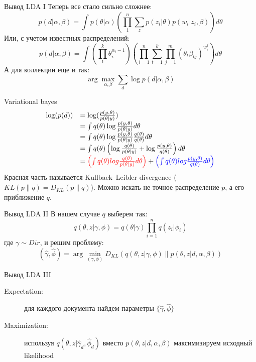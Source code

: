 \documentclass[14pt, fleqn, xcolor={dvipsnames, table}]{beamer}
\begin{document}
\begin{frame}{Вывод LDA I}
Теперь все стало сильно сложнее:
$$
p(d|\alpha, \beta) = \int p(\theta | \alpha)\left(\prod_1^n\sum_{z}p(z_i|\theta)p(w_i|z_i,\beta)\right) d\theta
$$
Или, с учетом известных распределений:
$$
p(d|\alpha, \beta) = \int \left(\prod_1^k \theta^{\alpha_i-1}_i\right)\left(\prod_{i=1}^n\sum_{t=1}^k\prod_{j=1}^m(\theta_t\beta_{tj})^{w_i^j}\right)d\theta
$$
А для коллекции еще и так:
$$
\arg \max_{\alpha, \beta} \sum_d \log p(d|\alpha, \beta)
$$
\end{frame}

\begin{frame}{Variational bayes}
$$\begin{array}{ll}
\log(p(d)) &= \log(\frac{p(y,\theta)}{p(\theta|y)}) \\
&= \int q(\theta) \log \frac{p(y,\theta)}{p(\theta|y)} d\theta \\
&= \int q(\theta) \log \frac{p(y,\theta)}{p(\theta|y)}\frac{q(\theta)}{q(\theta)} d\theta \\
&= \int q(\theta) \left(\log \frac{q(\theta)}{p(\theta|y)} + \log \frac{p(y,\theta)}{q(\theta)}\right) d\theta \\
&= {\color{red}\left(\int q(\theta) log \frac{q(\theta)}{p(\theta|y)}d\theta\right)} + {\color{blue}\left(\int q(\theta) log \frac{p(y,\theta)}{q(\theta)} d\theta\right)} \\
\end{array}$$
Красная часть называется Kullback–Leibler divergence ($KL(p\|q)=D_{KL}(p\|q)$). Можно искать не точное распределение $p$, а его приближение $q$.
\end{frame}

\begin{frame}{Вывод LDA II}
В нашем случае $q$ выберем так:
$$
q(\theta,z|\gamma,\phi) = q(\theta|\gamma) \prod_{i=1}^n q(z_i | \phi_i)
$$
где $\gamma \sim Dir$, и решим проблему:
$$
(\hat{\gamma},\hat{\phi}) = \arg \min_{(\gamma,\phi)} D_{KL}(q(\theta,z|\gamma,\phi)\|p(\theta, z|d,\alpha,\beta))
$$
\end{frame}

\begin{frame}{Вывод LDA III}
\begin{description}
  \item[Expectation:] для каждого документа найдем параметры $\{\hat{\gamma}, \hat{\phi}\}$
  \item[Maximization:] используя $q(\theta,z|\hat{\gamma}_d, \hat{\phi}_d)$ вместо $p(\theta,z|d,\alpha, \beta)$ максимизируем исходный likelihood
\end{description}
\end{frame}

\end{document}
